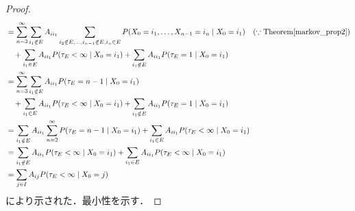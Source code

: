 \documentclass[dvipdfmx,autodetect-engine]{jsarticle}
\theoremstyle{remark}
\theoremstyle{definition}
\begin{document}
\begin{proof}
\begin{align}
        &= \sum_{n=3}^{\infty} \sum_{i_{1} \notin E} A_{i i_{1}}
        \sum_{i_2 \notin E,\ldots,i_{n-1}\notin E,i_n\in E} 
        P(X_0 = i_1,\ldots,X_{n-1} = i_n \mid X_0 = i_1) 
        \quad (\because \mathrm{Theorem}\ref{markov_prop2})\\
        &\quad + \sum_{i_{1} \in E} A_{i i_{1}} P(\tau_{E} <\infty \mid X_0 = i_{1})
        + \sum_{i_{1} \notin E} A_{i i_{1}} P(\tau_{E} = 1 \mid X_0 = i_{1})\\
        &= \sum_{n=3}^{\infty} \sum_{i_{1} \notin E} A_{i i_{1}} 
        P(\tau_{E} = n-1 \mid X_0 = i_1) \\
        &\quad + \sum_{i_{1} \in E} A_{i i_{1}} P(\tau_{E} <\infty \mid X_0 = i_{1})
        + \sum_{i_{1} \notin E} A_{i i_{1}} P(\tau_{E} = 1 \mid X_0 = i_{1})\\
        &= \sum_{i_{1} \notin E} A_{i i_{1}} \sum_{n=2}^{\infty} 
        P(\tau_{E} = n-1 \mid X_0 = i_1) 
        + \sum_{i_{1} \in E} A_{i i_{1}} P(\tau_{E} <\infty \mid X_0 = i_{1})\\
        &= \sum_{i_{1} \notin E} A_{i i_{1}} P(\tau_{E} < \infty \mid X_0 = i_{1})
        + \sum_{i_{1} \in E} A_{i i_{1}} P(\tau_{E} <\infty \mid X_0 = i_{1})\\
        &= \sum_{j \in I} A_{i j} P(\tau_{E} < \infty \mid X_0 = j)
    \end{align}
    により示された．最小性を示す．
\end{proof}
\end{document}
